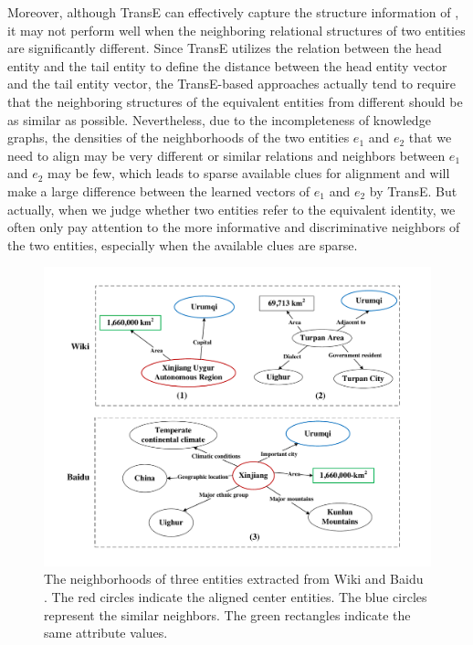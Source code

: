 	Moreover, although TransE can effectively capture the structure information of \KGs, it may not perform well when the neighboring relational structures of two entities are significantly different. Since TransE utilizes the relation between the head entity and the tail entity to define the distance between the head entity vector and the tail entity vector, the TransE-based approaches actually tend to require that the neighboring structures of the equivalent entities from different \KGs should be as similar as possible. Nevertheless, due to the incompleteness of knowledge graphs, the densities of the neighborhoods of the two entities $e_1$ and $e_2$ that we need to align may be very different or similar relations and neighbors between $e_1$ and $e_2$ may be few, which leads to sparse available clues for alignment and will make a large difference between the learned vectors of $e_1$ and $e_2$ by TransE. But actually, when we judge whether two entities refer to the equivalent identity, we often only pay attention to the more informative and discriminative neighbors of the two entities, especially when the available clues are sparse.
	\begin{figure}
		\centering
			\includegraphics[width=1\linewidth]{figures/graph1.pdf}
			\caption{The neighborhoods of three entities extracted from Wiki and Baidu \KGs. The red circles indicate the aligned center entities. The blue circles represent the similar neighbors. The green rectangles indicate the same attribute values.}
			\label{Xinjiang}
	\end{figure}
